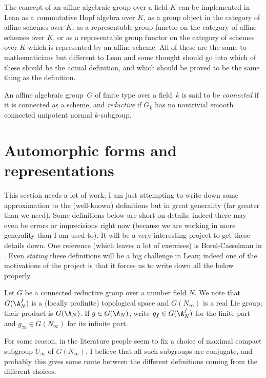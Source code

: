The concept of an affine algebraic group over a field $K$ can be implemented in Lean as a commutative Hopf algebra over $K$, as a group object in the category of affine schemes over $K$, as a representable group functor on the category of affine schemes over $K$, or as a representable group functor on the category of schemes over $K$ which is represented by an affine scheme. All of these are the same to mathematicians but different to Lean and some thought should go into which of these should be the actual definition, and which should be proved to be the same thing as the definition.

\begin{definition}\label{connected_reductive_group}\notready An affine algebraic group~$G$ of finite type over a field~$k$ is said to be \emph{connected} if it is connected as a scheme, and \emph{reductive} if $G_{\overline{k}}$ has no nontrivial smooth connected unipotent normal $k$-subgroup.
\end{definition}

\section{Automorphic forms and representations}

This section needs a lot of work; I am just attempting to write down some approximation to the (well-known) definitions but in great generality (far greater than we need). Some definitions below are short on details; indeed there may even be errors or imprecisions right now (because we are working in more generality than I am used to). It will be a very interesting project to get these details down. One reference (which leaves a lot of exercises) is Borel-Casselman in \cite{corvallis1}. Even \emph{stating} these definitions will be a big challenge in Lean; indeed one of the motivations of the project is that it forces us to write down all the below properly.

Let $G$ be a connected reductive group over a number field $N$.  We note
that $G(\A_N^f)$ is a (locally profinite) topological space and $G(N_\infty)$ is a real Lie group;
their product is $G(\A_N)$. If $g\in G(\A_N)$, write $g_f\in G(\A_N^f)$ for the finite part and $g_\infty\in G(N_\infty)$ for its infinite part.

For some reason, in the literature people seem to fix a choice of maximal compact subgroup $U_\infty$ of $G(N_\infty)$. I believe that all such subgroups are conjugate, and probably this gives some route between the different definitions coming from the different choices.

